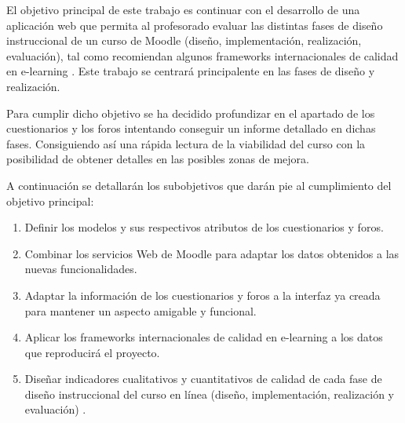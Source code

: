 
El objetivo principal de este trabajo es continuar con el desarrollo de una aplicación web que permita al profesorado evaluar las distintas fases de diseño instruccional de un curso de Moodle (diseño, implementación, realización, evaluación), tal como recomiendan algunos frameworks internacionales de calidad en e-learning \cite{previotfg}. Este trabajo se centrará principalente en las fases de diseño y realización.

Para cumplir dicho objetivo se ha decidido profundizar en el apartado de los cuestionarios y los foros intentando conseguir un informe detallado en dichas fases. Consiguiendo así una rápida lectura de la viabilidad del curso con la posibilidad de obtener detalles en las posibles zonas de mejora.

A continuación se detallarán los subobjetivos que darán pie al cumplimiento del objetivo principal:
\begin{enumerate}
    \item Definir los modelos y sus respectivos atributos de los cuestionarios y foros.
    \item Combinar los servicios Web de Moodle para adaptar los datos obtenidos a las nuevas funcionalidades.
    \item Adaptar la información de los cuestionarios y foros a la interfaz ya creada para mantener un aspecto amigable y funcional.
    \item Aplicar los frameworks internacionales de calidad en e-learning a los datos que reproducirá el proyecto.
    \item Diseñar indicadores cualitativos y cuantitativos de calidad de cada fase de diseño instruccional del curso en línea (diseño, implementación, realización y evaluación) \cite{previotfg}.
\end{enumerate}